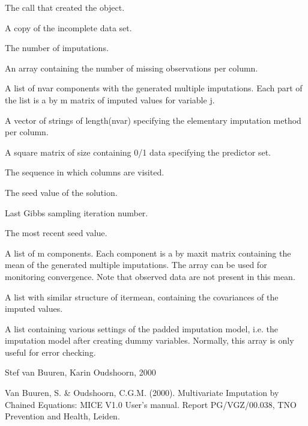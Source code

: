 \documentclass{article}
\begin{document}
\begin{Value}
\begin{ldescription}
\item[\code{call}] The call that created the object.
\item[\code{data}] A copy of the incomplete data set.
\item[\code{m}] The number of imputations.
\item[\code{nmis}] An array containing the number of missing observations per column.
\item[\code{imp}] A list of nvar components with the generated multiple imputations. 
Each part of the list is a  by m matrix of imputed values for 
variable j.
\item[\code{imputationMethod}] A vector of strings of length(nvar) specifying the elementary 
imputation method per column.
\item[\code{predictorMatrix}] A square matrix of size  containing 0/1 data specifying 
the predictor set.
\item[\code{visitSequence}] The sequence in which columns are visited.
\item[\code{seed}] The seed value of the solution.
\item[\code{iteration}] Last Gibbs sampling iteration number.
\item[\code{lastSeedValue}] The most recent seed value.
\item[\code{chainMean}] A list of m components. Each component is a 
by maxit matrix containing the mean of the generated multiple 
imputations. The array can be used for monitoring convergence.
Note that observed data are not present in this mean.
\item[\code{chainCov}] A list with similar structure of itermean, containing the covariances 
of the imputed values.
\item[\code{pad}] A list containing various settings of the padded imputation model, 
i.e. the imputation model after creating dummy variables. Normally, 
this array is only useful for error checking.
\end{ldescription}
\end{Value}
\begin{Author}\relax
Stef van Buuren, Karin Oudshoorn, 2000
\end{Author}
\begin{References}\relax
Van Buuren, S. \& Oudshoorn, C.G.M. (2000). Multivariate Imputation by Chained Equations: 
MICE V1.0 User's manual. Report PG/VGZ/00.038, TNO Prevention and Health, Leiden.
\end{References}
\end{document}
